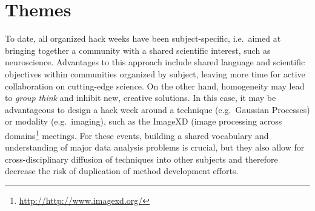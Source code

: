 \section*{Themes}

To date, all organized hack weeks have been subject-specific, i.e.\ aimed at bringing together a community with a shared scientific interest, such as neuroscience.
Advantages to this approach include shared language and scientific objectives within communities organized by subject, leaving more time for active collaboration on cutting-edge science.
On the other hand, homogeneity may lead to \textit{group think} and inhibit new, creative solutions. 
In this case, it may be advantageous to design a hack week around a technique (e.g.\ Gaussian Processes) or modality (e.g.\ imaging), such as the ImageXD (image processing across domains\footnote{\url{http://http://www.imagexd.org/}} meetings. 
For these events, building a shared vocabulary and understanding of major data analysis problems is crucial, but they also allow for cross-disciplinary diffusion of techniques into other subjects and therefore decrease the risk of duplication of method development efforts.



